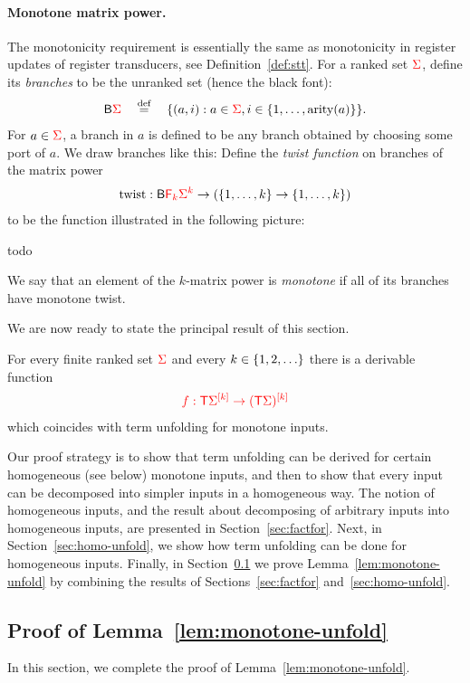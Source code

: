 \paragraph{Monotone matrix power.}
The monotonicity requirement is essentially the same as monotonicity in register updates of register transducers, see Definition~\ref{def:stt}. 
For a ranked set $\rSigma$, define its \emph{branches} to be the unranked set (hence the black font):
\begin{align*}
\branches \rSigma \quad \eqdef \quad \set{(a,i) : a \in \rSigma, i \in \set{1,\ldots,\arity a}}.
\end{align*}
For $a \in  \rSigma$, a branch in $a$ is defined to be any branch obtained by choosing some port of $a$. 
We draw branches like this:
Define the \emph{twist function} on branches of the matrix power 
\begin{align*}
\mathrm{twist} : \branches \reduce k \ranked{\Sigma^k}  \to (\set{1,\ldots,k} \to \set{1,\ldots,k})
\end{align*}
to be the function illustrated in the following picture:
\begin{center}
    todo
\end{center}

\begin{definition}
     \label{def:monotone-matrix-power} We say that an element of the $k$-matrix power is \emph{monotone} if all of its branches have monotone twist.
\end{definition}
 We are now ready to state the principal result of this section.

\begin{lemma}\label{lem:monotone-unfold}
    For every finite ranked set $\rSigma$ and every $k \in \set{1,2,\ldots}$ there is a derivable function 
    \begin{align*}
    \ranked{ f : \tmonad \mati k \Sigma \to \mati k {(\tmonad \Sigma)}}
    \end{align*}
    which coincides with term unfolding for monotone inputs.
\end{lemma}

Our proof strategy is to show that term unfolding can be derived for certain homogeneous (see below) monotone inputs, and then to show that every input can be decomposed into simpler inputs in a homogeneous way. The notion of homogeneous inputs, and the result about  decomposing of arbitrary inputs into homogeneous inputs, are presented in Section~\ref{sec:factfor}. Next, in Section~\ref{sec:homo-unfold}, we show how term unfolding can be done for homogeneous inputs. Finally, in Section~\ref{sec:monotone-unfold-proof} we prove Lemma~\ref{lem:monotone-unfold} by combining  the results of Sections~\ref{sec:factfor} and~\ref{sec:homo-unfold}.




\subsection{Proof of Lemma~\ref{lem:monotone-unfold}}
\label{sec:monotone-unfold-proof}
In this section, we complete the proof of Lemma~\ref{lem:monotone-unfold}. 